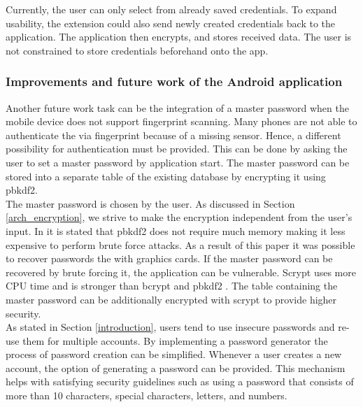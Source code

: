 Currently, the user can only select from already saved credentials. To expand usability, the extension could also send newly created credentials back to the application. The application then encrypts, and stores received data. The user is not constrained to store credentials beforehand onto the app. 

\subsubsection*{Improvements and future work of the Android application}
Another future work task can be the integration of a master password when the mobile device does not support fingerprint scanning. Many phones are not able to authenticate the via fingerprint because of a missing sensor. Hence, a different possibility for authentication must be provided. This can be done by asking the user to set a master password by application start. The master password can be stored into a separate table of the existing database by encrypting it using \gls{pbkdf2}. \\
The master password is chosen by the user. As discussed in Section \ref{arch_encryption}, we strive to make the encryption independent from the user's input. In \cite{percival2009stronger} it is stated that \gls{pbkdf2} does not require much memory making it less expensive to perform brute force attacks. As a result of this paper \cite{DurmuthGKPYZ12} it was possible to recover passwords the with graphics cards. If the master password can be recovered by brute forcing it, the application can be vulnerable. Scrypt uses more CPU time and is stronger than bcrypt and \gls{pbkdf2} \cite{percival2009stronger}. The table containing the master password can be additionally encrypted with scrypt to provide higher security. \\

As stated in Section \ref{introduction}, users tend to use insecure passwords and re-use them for multiple accounts. By implementing a password generator the process of password creation can be simplified. Whenever a user creates a new account, the option of generating a password can be provided. This mechanism helps with satisfying security guidelines such as using a password that consists of more than 10 characters, special characters, letters, and numbers.

